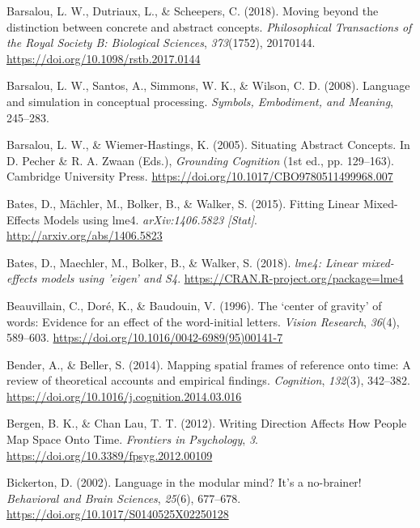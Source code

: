 \documentclass[
  a4paper,12pt,twoside,onecolumn,openright,final,oldfontcommands]{memoir}
\newlength{\cslhangindent}
\newlength{\cslentryspacingunit} %
\newenvironment{CSLReferences}[2] %
 {%
  \setlength{\parindent}{0pt}
  \ifodd #1
  \let\oldpar\par
  \def\par{\hangindent=\cslhangindent\oldpar}
  \fi
  \setlength{\parskip}{#2\cslentryspacingunit}
 }%
 {}
\begin{document}
\begin{CSLReferences}{1}{0}
\leavevmode{}%
Barsalou, L. W., Dutriaux, L., \& Scheepers, C. (2018). Moving beyond the distinction between concrete and abstract concepts. \emph{Philosophical Transactions of the Royal Society B: Biological Sciences}, \emph{373}(1752), 20170144. \url{https://doi.org/10.1098/rstb.2017.0144}

\leavevmode{}%
Barsalou, L. W., Santos, A., Simmons, W. K., \& Wilson, C. D. (2008). Language and simulation in conceptual processing. \emph{Symbols, Embodiment, and Meaning}, 245--283.

\leavevmode{}%
Barsalou, L. W., \& Wiemer-Hastings, K. (2005). Situating {Abstract} {Concepts}. In D. Pecher \& R. A. Zwaan (Eds.), \emph{Grounding {Cognition}} (1st ed., pp. 129--163). Cambridge University Press. \url{https://doi.org/10.1017/CBO9780511499968.007}

\leavevmode{}%
Bates, D., Mächler, M., Bolker, B., \& Walker, S. (2015). Fitting {Linear} {Mixed}-{Effects} {Models} using lme4. \emph{arXiv:1406.5823 {[}Stat{]}}. \url{http://arxiv.org/abs/1406.5823}

\leavevmode{}%
Bates, D., Maechler, M., Bolker, B., \& Walker, S. (2018). \emph{lme4: Linear mixed-effects models using 'eigen' and S4}. \url{https://CRAN.R-project.org/package=lme4}

\leavevmode{}%
Beauvillain, C., Doré, K., \& Baudouin, V. (1996). The {`center of gravity'} of words: {Evidence} for an effect of the word-initial letters. \emph{Vision Research}, \emph{36}(4), 589--603. \url{https://doi.org/10.1016/0042-6989(95)00141-7}

\leavevmode{}%
Bender, A., \& Beller, S. (2014). Mapping spatial frames of reference onto time: {A} review of theoretical accounts and empirical findings. \emph{Cognition}, \emph{132}(3), 342--382. \url{https://doi.org/10.1016/j.cognition.2014.03.016}

\leavevmode{}%
Bergen, B. K., \& Chan Lau, T. T. (2012). Writing {Direction} {Affects} {How} {People} {Map} {Space} {Onto} {Time}. \emph{Frontiers in Psychology}, \emph{3}. \url{https://doi.org/10.3389/fpsyg.2012.00109}

\leavevmode{}%
Bickerton, D. (2002). Language in the modular mind? {It}'s a no-brainer! \emph{Behavioral and Brain Sciences}, \emph{25}(6), 677--678. \url{https://doi.org/10.1017/S0140525X02250128}


\end{CSLReferences}
\end{document}

